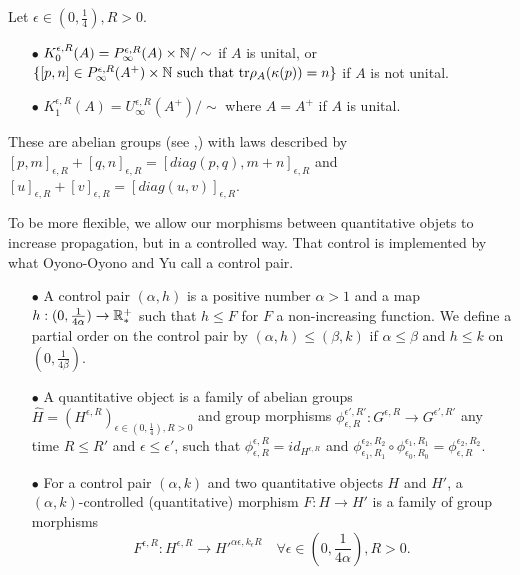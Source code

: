 \begin{definition}
Let $\epsilon\in (0,\frac{1}{4}),R>0$.\\
\begin{itemize}
\item[$\bullet$] $K_0^{\epsilon,R}(A)=P_\infty^{\epsilon,R}(A)\times\mathbb N / \sim$ if $A$ is unital, or $\{[p,n]\in P^{\epsilon,R}_\infty(A^+)\times\mathbb N\text{ such that tr}\rho_A(\kappa (p))=n\}$ if $A$ is not unital.
\item[$\bullet$] $K_1^{\epsilon,R}(A)=U^{\epsilon,R}_\infty(A^+)/\sim$ where $A=A^+$ if $A$ is unital.
\end{itemize}
\end{definition}

These are abelian groups (see \cite{OY2},\cite{OY3}) with laws described by $[p,m]_{\epsilon,R}+[q,n]_{\epsilon,R}=[diag(p,q),m+n]_{\epsilon,R}$ and $[u]_{\epsilon,R}+[v]_{\epsilon,R}=[diag(u,v)]_{\epsilon,R}$.
\begin{definition}
To be more flexible, we allow our morphisms between quantitative objets to increase propagation, but in a controlled way. That control is implemented by what Oyono-Oyono and Yu call a control pair.
\begin{itemize}
\item[$\bullet$] A control pair $(\alpha,h)$ is a positive number $\alpha>1$ and a map $h:(0,\frac{1}{4\alpha})\rightarrow \mathbb R_*^+$ such that $h\leq  F $ for $F$ a non-increasing function. We define a partial order on the control pair by $(\alpha,h)\leq (\beta,k)$ if $\alpha\leq \beta$ and $h\leq k$ on $(0,\frac{1}{4\beta})$.
\item[$\bullet$] A quantitative object is a family of abelian groups $\hat H=(H^{\epsilon,R})_{\epsilon\in(0,\frac{1}{4}),R>0}$ and group morphisms $\phi_{\epsilon,R}^{\epsilon',R'}: G^{\epsilon,R}\rightarrow G^{\epsilon',R'}$ any time $R\leq R'$ and $\epsilon\leq \epsilon'$, such that $\phi_{\epsilon,R}^{\epsilon,R}=id_{H^{\epsilon,R}}$ and $\phi_{\epsilon_1,R_1}^{\epsilon_2,R_2}\circ \phi_{\epsilon_0,R_0}^{\epsilon_1,R_1}=\phi_{\epsilon,R}^{\epsilon_2,R_2}$.
\item[$\bullet$] For a control pair $(\alpha,k)$ and two quantitative objects $H$ and $H'$, a $(\alpha,k)$-controlled (quantitative) morphism $F:H\rightarrow H'$ is a family of group morphisms
\[F^{\epsilon,R}: H^{\epsilon,R}\rightarrow H'^{\alpha\epsilon,k_\epsilon R}\quad\forall \epsilon\in (0,\frac{1}{4\alpha}),R>0.\]
\end{itemize}
\end{definition}

